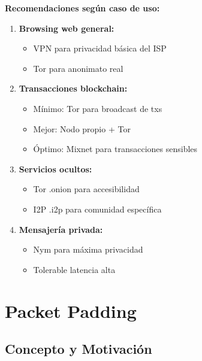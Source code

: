 \documentclass[11pt,a4paper,twoside]{book}
\theoremstyle{definition}
\theoremstyle{remark}
\begin{document}
\begin{keyidea}
\textbf{Recomendaciones según caso de uso:}

\begin{enumerate}
    \item \textbf{Browsing web general:}
    \begin{itemize}
        \item VPN para privacidad básica del ISP
        \item Tor para anonimato real
    \end{itemize}
    
    \item \textbf{Transacciones blockchain:}
    \begin{itemize}
        \item Mínimo: Tor para broadcast de txs
        \item Mejor: Nodo propio + Tor
        \item Óptimo: Mixnet para transacciones sensibles
    \end{itemize}
    
    \item \textbf{Servicios ocultos:}
    \begin{itemize}
        \item Tor .onion para accesibilidad
        \item I2P .i2p para comunidad específica
    \end{itemize}
    
    \item \textbf{Mensajería privada:}
    \begin{itemize}
        \item Nym para máxima privacidad
        \item Tolerable latencia alta
    \end{itemize}
\end{enumerate}
\end{keyidea}
\section{Packet Padding}
\label{sec:packet-padding}

\subsection{Concepto y Motivación}
\end{document}
